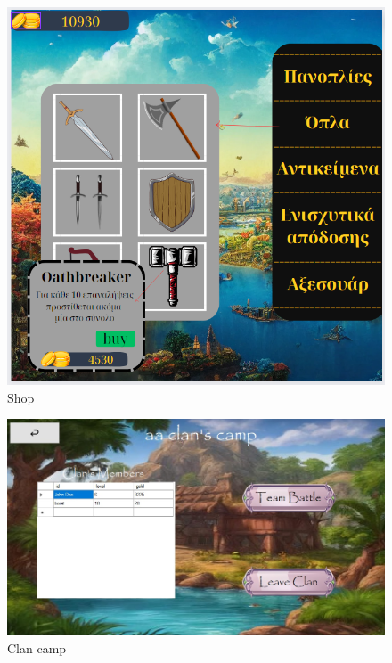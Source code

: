\begin{figure}[!htb]
  \centering
    \centering
    \includegraphics[width=\textwidth]{mockup8.jpg}
    \caption{Shop}
    \label{}
\end{figure}	
\begin{figure}[!htb]
  \centering
    \centering
    \includegraphics[width=\textwidth]{mockup9.jpg}
    \caption{Clan camp}
    \label{}
\end{figure}